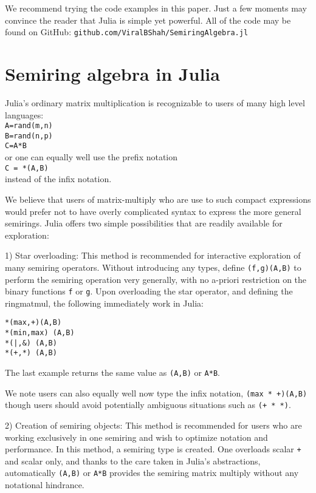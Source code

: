 \documentclass[conference]{IEEEtran}
\begin{document}
We recommend trying the code examples in this paper.  Just a few moments may
convince the reader that Julia is simple yet powerful.
All of the code may be found on GitHub:
\verb+github.com/ViralBShah/SemiringAlgebra.jl+



\section{Semiring algebra in Julia}

Julia's ordinary matrix multiplication is recognizable to users of many
high level languages: \\
{\tt A=rand(m,n) \\  B=rand(n,p) \\ C=A*B } \\ 
or one can equally well use the prefix notation \\
{\tt C = *(A,B)} \\ 
instead of the infix notation.

We believe that users of matrix-multiply who are use 
to such compact expressions would prefer not to have 
overly complicated syntax to express the more general 
semirings.  Julia offers two simple possibilities that are readily
available for exploration: 

1) Star overloading:
This method is recommended for interactive exploration of many semiring operators. 
Without introducing any types, define  {\tt *(f,g)(A,B)} to 
perform the semiring operation very generally, with no a-priori restriction
on the binary functions {\tt f} or {\tt g}.   Upon overloading the star operator,
and defining the ringmatmul, the following immediately work in Julia:
\begin{verbatim}
*(max,+)(A,B)  
*(min,max) (A,B)  
*(|,&) (A,B)  
*(+,*) (A,B)
\end{verbatim}  
The last example returns the same value as {\tt *(A,B)} or {\tt A*B}.

We note users can also equally well now type the infix notation,
{\tt (max * +)(A,B) } though users should avoid potentially ambiguous situations such as
{\tt (+ * *)}.

2) Creation of semiring objects:  This method is recommended for users who are working exclusively in one semiring and wish to optimize notation and performance.  In this method,
a semiring type is created.  One overloads scalar {\tt +} and scalar {\tt *} only,
and thanks to the care taken in Julia's abstractions,  automatically 
{\tt *(A,B)} or {\tt A*B} provides the semiring matrix multiply without any notational
hindrance.
   
\end{document}

